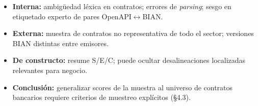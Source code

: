 \begin{itemize}
  \item \textbf{Interna:} ambigüedad léxica en contratos; errores de \textit{parsing}; sesgo en
        etiquetado experto de pares OpenAPI$\leftrightarrow$BIAN.
  \item \textbf{Externa:} muestra de contratos no representativa de todo el sector; versiones BIAN
        distintas entre emisores.
  \item \textbf{De constructo:} \AlignmentScore{} resume S/E/C; puede ocultar desalineaciones
        localizadas relevantes para negocio.
  \item \textbf{Conclusión:} generalizar scores de la muestra al universo de contratos bancarios
        requiere criterios de muestreo explícitos (§4.3).
\end{itemize}
